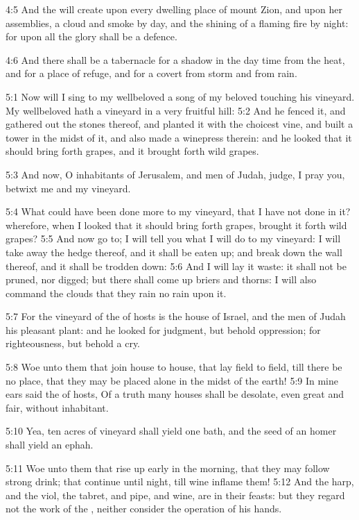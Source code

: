 4:5 And the \LORD will create upon every dwelling place of mount Zion, and upon her assemblies, a cloud and smoke by day, and the shining of a flaming fire by night: for upon all the glory shall be a defence.

4:6 And there shall be a tabernacle for a shadow in the day time from the heat, and for a place of refuge, and for a covert from storm and from rain.

5:1 Now will I sing to my wellbeloved a song of my beloved touching his vineyard. My wellbeloved hath a vineyard in a very fruitful hill: 5:2 And he fenced it, and gathered out the stones thereof, and planted it with the choicest vine, and built a tower in the midst of it, and also made a winepress therein: and he looked that it should bring forth grapes, and it brought forth wild grapes.

5:3 And now, O inhabitants of Jerusalem, and men of Judah, judge, I pray you, betwixt me and my vineyard.

5:4 What could have been done more to my vineyard, that I have not done in it? wherefore, when I looked that it should bring forth grapes, brought it forth wild grapes?  5:5 And now go to; I will tell you what I will do to my vineyard: I will take away the hedge thereof, and it shall be eaten up; and break down the wall thereof, and it shall be trodden down: 5:6 And I will lay it waste: it shall not be pruned, nor digged; but there shall come up briers and thorns: I will also command the clouds that they rain no rain upon it.

5:7 For the vineyard of the \LORD of hosts is the house of Israel, and the men of Judah his pleasant plant: and he looked for judgment, but behold oppression; for righteousness, but behold a cry.

5:8 Woe unto them that join house to house, that lay field to field, till there be no place, that they may be placed alone in the midst of the earth!  5:9 In mine ears said the \LORD of hosts, Of a truth many houses shall be desolate, even great and fair, without inhabitant.

5:10 Yea, ten acres of vineyard shall yield one bath, and the seed of an homer shall yield an ephah.

5:11 Woe unto them that rise up early in the morning, that they may follow strong drink; that continue until night, till wine inflame them!  5:12 And the harp, and the viol, the tabret, and pipe, and wine, are in their feasts: but they regard not the work of the \LORD, neither consider the operation of his hands.

